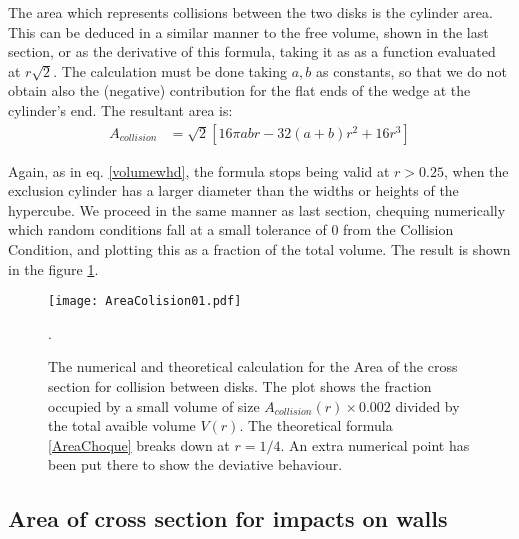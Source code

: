 \documentclass[a4paper,10pt, jcp, aps, preprint]{revtex4-1}
\begin{document}
The area which represents collisions between the two disks is the cylinder area. 
This can be deduced in a similar manner to the free volume, shown in the last
section, or as the derivative of this formula, taking it as as a function evaluated at 
$r\sqrt{2}$. The calculation must be done taking $a,b$ as constants, so that
we do not obtain also the (negative) contribution for the flat ends of
the wedge at the cylinder's end. The resultant area is:
\begin{align}\label{AreaChoque}
A_{collision} & =\sqrt{2}[  
16\pi a b r -32 (a+b)r^2 +16 r^3 ] 
\end{align}

Again, as in eq. \ref{volumewhd}, the formula stops being valid
at $r>0.25$, when the exclusion cylinder has a larger diameter than
the widths or heights of the hypercube.  
We proceed in the same manner as last section, chequing numerically which
random
conditions fall at a small tolerance of $0$ from the Collision Condition, and
plotting this as a fraction of the total volume. The result is shown in the
figure \ref{AreaChoqueTeoyNum}. 

\begin{figure}
\centering
\texttt{[image: AreaColision01.pdf]}
\caption{The numerical and theoretical calculation for the Area of the cross section
for collision between disks. The plot shows the fraction occupied by a small volume
of size $A_{collision}(r)\times 0.002$ divided by the total
avaible volume $V(r)$. The theoretical formula 
\ref{AreaChoque} breaks down at
$r=1/4$. 
An extra numerical point has been put there to show the deviative behaviour.}
\label{AreaChoqueTeoyNum}.
\end{figure}


\subsection{Area of cross section for  impacts on walls}
\end{document}
